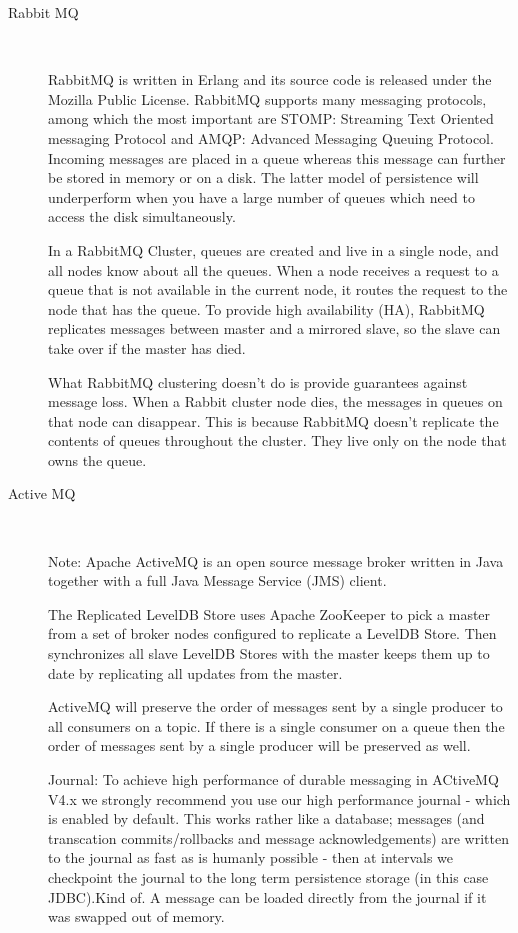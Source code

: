\begin{description}
    \item [Rabbit MQ] \hfill \\
    {
    RabbitMQ is written in Erlang and its source code is released under the
    Mozilla Public License. RabbitMQ supports many messaging protocols, among
    which the most important are STOMP: Streaming Text Oriented messaging
    Protocol and AMQP: Advanced Messaging Queuing Protocol. Incoming messages
    are placed in a queue whereas this message can further be stored in memory
    or on a disk. The latter model of persistence will underperform when you
    have a large number of queues which need to access the disk simultaneously.
    \cite{rabbitmq}

    In a RabbitMQ Cluster, queues are created and live in a single node, and all
    nodes know about all the queues. When a node receives a request to a queue
    that is not available in the current node, it routes the request to the node
    that has the queue. To provide high availability (HA), RabbitMQ replicates
    messages between master and a mirrored slave, so the slave can take over if the
    master has died. \cite{wickramarachchi2012andes}

    What RabbitMQ clustering doesn't do is provide guarantees against message loss.
    When a Rabbit cluster node dies, the messages in queues on that
    node can disappear. This is because RabbitMQ doesn't replicate the contents
    of queues throughout the cluster. They live only on the node that owns the
    queue. \cite{videla2012rabbitmq}
    }
    \item [Active MQ] \hfill \\
    {
    Note: Apache ActiveMQ is an open source message broker written in Java
    together with a full Java Message Service (JMS) client. 
    
    The Replicated
    LevelDB Store uses Apache ZooKeeper to pick a master from a set of broker
    nodes configured to replicate a LevelDB Store. Then synchronizes all slave
    LevelDB Stores with the master keeps them up to date by replicating all
    updates from the master. 
    
    ActiveMQ will preserve the order of messages sent
    by a single producer to all consumers on a topic. If there is a single
    consumer on a queue then the order of messages sent by a single producer
    will be preserved as well. 
    
    Journal: To achieve high performance of durable
    messaging in ACtiveMQ V4.x we strongly recommend you use our high
    performance journal - which is enabled by default. This works rather like a
    database; messages (and transcation commits/rollbacks and message
    acknowledgements) are written to the journal as fast as is humanly possible
    - then at intervals we checkpoint the journal to the long term persistence
    storage (in this case JDBC).Kind of. 
    A message can be loaded directly from the journal if it was swapped out of memory.
    
}
\end{description}
